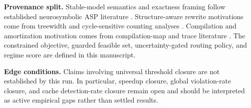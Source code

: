 \documentclass{article} %
\begin{document}
\textbf{Provenance split.} Stable-model semantics and exactness framing follow established neurosymbolic ASP literature \citep{src_012,src_019,src_039}. Structure-aware rewrite motivations come from treewidth and cycle-sensitive counting analyses \citep{src_045,src_046,src_047,src_048}. Compilation and amortization motivation comes from compilation-map and trace literature \citep{src_002,src_003,src_039}. The constrained objective, guarded feasible set, uncertainty-gated routing policy, and regime score are defined in this manuscript.

\textbf{Edge conditions.} Claims involving universal threshold closure are not established by this run. In particular, speedup closure, global violation-rate closure, and cache detection-rate closure remain open and should be interpreted as active empirical gaps rather than settled results.
\end{document}
